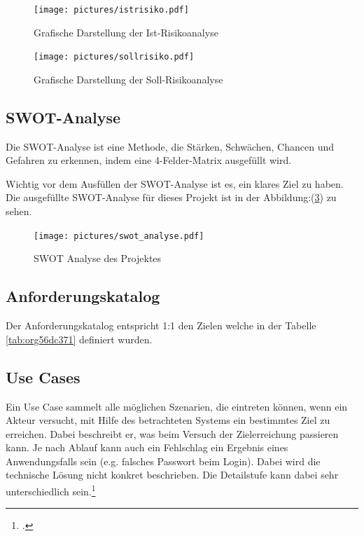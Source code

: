 \begin{figure}[H]
\centering
\texttt{[image: pictures/istrisiko.pdf]}
\caption{\label{fig:org64c4845}
Grafische Darstellung der Ist-Risikoanalyse}
\end{figure}

\begin{figure}[H]
\centering
\texttt{[image: pictures/sollrisiko.pdf]}
\caption{\label{fig:org2d72343}
Grafische Darstellung der Soll-Risikoanalyse}
\end{figure}

\newpage
\subsection{SWOT-Analyse}
\label{sec:orgc693367}

Die SWOT-Analyse ist eine Methode, die Stärken, Schwächen, Chancen und
Gefahren zu erkennen, indem eine 4-Felder-Matrix ausgefüllt wird.

Wichtig vor dem Ausfüllen der SWOT-Analyse ist es, ein klares Ziel zu
haben. Die ausgefüllte SWOT-Analyse für dieses Projekt ist in der
Abbildung:(\ref{fig:orge38b33e}) zu sehen.

\begin{figure}[htbp]
\centering
\texttt{[image: pictures/swot\_analyse.pdf]}
\caption{\label{fig:orge38b33e}
SWOT Analyse des Projektes}
\end{figure}

\subsection{Anforderungskatalog}
\label{sec:orga95a76c}

Der Anforderungskatalog entspricht 1:1 den Zielen welche in der Tabelle
\ref{tab:org56dc371} definiert wurden.

\subsection{Use Cases}
\label{sec:org866931c}

Ein Use Case sammelt alle möglichen Szenarien, die eintreten können,
wenn ein Akteur versucht, mit Hilfe des betrachteten Systems ein
bestimmtes Ziel zu erreichen. Dabei beschreibt er, was beim Versuch der
Zielerreichung passieren kann. Je nach Ablauf kann auch ein Fehlschlag
ein Ergebnis eines Anwendungsfalls sein (e.g. falsches Passwort beim
Login). Dabei wird die technische Lösung nicht konkret beschrieben.
Die Detailstufe kann dabei sehr unterschiedlich sein.\footcite{usecase}

